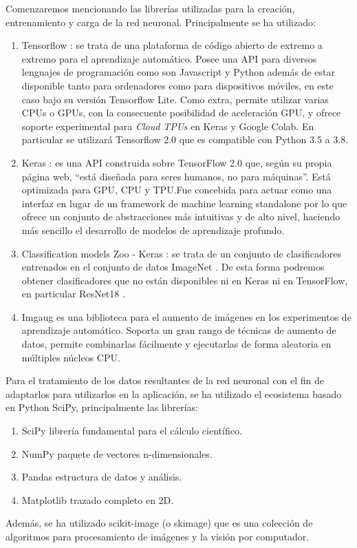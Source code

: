 Comenzaremos mencionando las librerías utilizadas para la creación, entrenamiento y carga de la red neuronal. Principalmente se ha utilizado:
\begin{enumerate}
\item Tensorflow \cite{tensorflow2015-whitepaper}:  se trata de una plataforma de código abierto de extremo a extremo para el aprendizaje automático. Posee una API para diversos lenguajes de programación como son Javascript y Python además de estar disponible tanto para ordenadores como para dispositivos móviles, en este caso bajo su versión Tensorflow Lite. Como extra, permite utilizar varias CPUs o GPUs, con la consecuente posibilidad de aceleración GPU, y ofrece soporte experimental para \emph{Cloud TPUs} en Keras y Google Colab. En particular se utilizará Tensorflow 2.0 que es compatible con Python 3.5 a 3.8.
\item Keras \cite{chollet2015keras} : es una API construida sobre TensorFlow 2.0 que, según su propia página web, ``está diseñada para seres humanos, no para máquinas''. Está optimizada para GPU, CPU y TPU.Fue concebida para actuar como una interfaz en lugar de un framework de machine learning standalone por lo que ofrece un conjunto de abstracciones más intuitivas y de alto nivel, haciendo más sencillo el desarrollo de modelos de aprendizaje profundo.
\item Classification models Zoo - Keras \cite{classification_models}: se trata de un conjunto de clasificadores entrenados en el conjunto de datos ImageNet \cite{imagenet_cvpr09}. De esta forma podremos obtener clasificadores que no están disponibles ni en Keras ni en TensorFlow, en particular ResNet18 \cite{DBLP:journals/corr/HeZRS15}.
\item Imgaug \cite{imgaug} es una biblioteca para el aumento de imágenes en los experimentos de aprendizaje automático. Soporta un gran rango de técnicas de aumento de datos, permite combinarlas fácilmente y ejecutarlas de forma aleatoria en múltiples núcleos CPU.
\end{enumerate}

Para el tratamiento de los datos resultantes de la red neuronal con el fin de adaptarlos para utilizarlos en la aplicación, se ha utilizado el ecosistema basado en Python SciPy, principalmente las librerías:
\begin{enumerate}
\item SciPy \cite{2020SciPy-NMeth} librería fundamental para el cálculo científico.
\item NumPy \cite{2020NumPy-Array} paquete de vectores n-dimensionales.
\item Pandas \cite{reback2020pandas} \cite{mckinney-proc-scipy-2010} estructura de datos y análisis.
\item Matplotlib \cite{Hunter:2007} trazado completo en 2D.
\end{enumerate}
Además, se ha utilizado scikit-image \cite{scikit-image} (o skimage) que es una colección de algoritmos para procesamiento de imágenes y la visión por computador.\\

